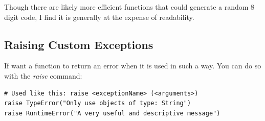 \documentclass{article}
\begin{document}
Though there are likely more efficient functions that could generate a random 8 digit code, I find it is generally at the expense of readability.
\subsection{Raising Custom Exceptions}

If want a function to return an error when it is used in such a way. You can do so with the \textit{raise} command:
\begin{verbatim}
# Used like this: raise <exceptionName> (<arguments>)
raise TypeError("Only use objects of type: String")
raise RuntimeError("A very useful and descriptive message")
\end{verbatim}
\end{document}
